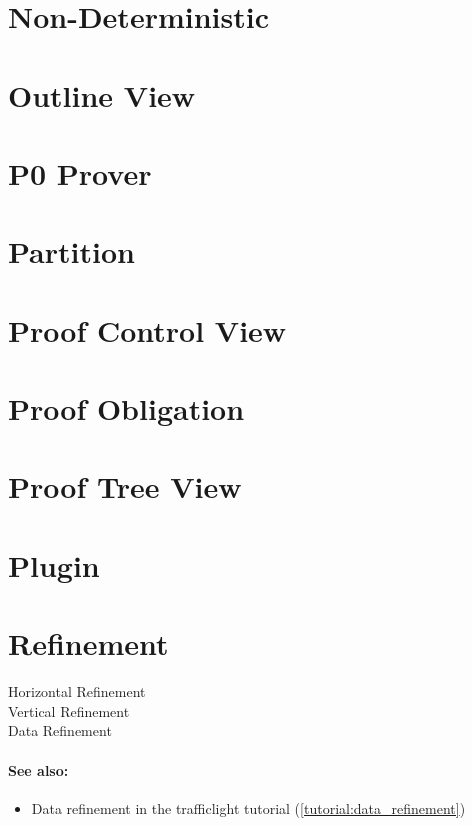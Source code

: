 \section{Non-Deterministic}
\label{non_deterministic}

\section{Outline View}
\label{outline_view}

\section{P0 Prover}
\label{p0_prover}

\section{Partition}
\label{partition}

\section{Proof Control View}
\label{proof_control_view}

\section{Proof Obligation}
\label{proof_obligation}

\section{Proof Tree View}
\label{proof_tree_view}

\section{Plugin}
\label{plugin}

\section{Refinement}
\label{refinement}

\begin{description}
	\item[Horizontal Refinement]
	\item[Vertical Refinement]
	\item[Data Refinement]
\end{description}

\paragraph*{See also:}
\begin{itemize}
\item Data refinement in the trafficlight tutorial (\ref{tutorial:data_refinement})
\end{itemize}

